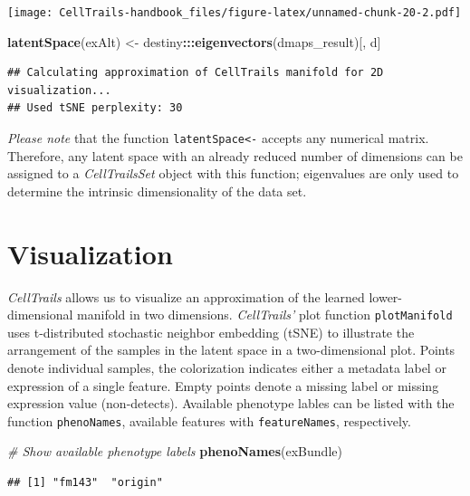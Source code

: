 \documentclass[]{book}
\newenvironment{Shaded}{\begin{snugshade}}{\end{snugshade}}
\newcommand{\KeywordTok}[1]{\textcolor[rgb]{0.13,0.29,0.53}{\textbf{#1}}}
\newcommand{\StringTok}[1]{\textcolor[rgb]{0.31,0.60,0.02}{#1}}
\newcommand{\CommentTok}[1]{\textcolor[rgb]{0.56,0.35,0.01}{\textit{#1}}}
\newcommand{\OperatorTok}[1]{\textcolor[rgb]{0.81,0.36,0.00}{\textbf{#1}}}
\newcommand{\NormalTok}[1]{#1}
\theoremstyle{definition}
\theoremstyle{definition}
\theoremstyle{definition}
\theoremstyle{remark}
\begin{document}
\texttt{[image: CellTrails-handbook\_files/figure-latex/unnamed-chunk-20-2.pdf]}

\begin{Shaded}
\begin{Highlighting}[]
\KeywordTok{latentSpace}\NormalTok{(exAlt) <-}\StringTok{ }\NormalTok{destiny}\OperatorTok{:::}\KeywordTok{eigenvectors}\NormalTok{(dmaps_result)[, d]}
\end{Highlighting}
\end{Shaded}

\begin{verbatim}
## Calculating approximation of CellTrails manifold for 2D visualization...
## Used tSNE perplexity: 30
\end{verbatim}

\emph{Please note} that the function \texttt{latentSpace\textless{}-}
accepts any numerical matrix. Therefore, any latent space with an
already reduced number of dimensions can be assigned to a
\emph{CellTrailsSet} object with this function; eigenvalues are only
used to determine the intrinsic dimensionality of the data set.

\section{Visualization}\label{visualization}

\emph{CellTrails} allows us to visualize an approximation of the learned
lower-dimensional manifold in two dimensions. \emph{CellTrails'} plot
function \texttt{plotManifold} uses t-distributed stochastic neighbor
embedding (tSNE) \citep{vdmaaten2008} to illustrate the arrangement of
the samples in the latent space in a two-dimensional plot. Points denote
individual samples, the colorization indicates either a metadata label
or expression of a single feature. Empty points denote a missing label
or missing expression value (non-detects). Available phenotype lables
can be listed with the function \texttt{phenoNames}, available features
with \texttt{featureNames}, respectively.

\begin{Shaded}
\begin{Highlighting}[]
\CommentTok{# Show available phenotype labels}
\KeywordTok{phenoNames}\NormalTok{(exBundle)}
\end{Highlighting}
\end{Shaded}

\begin{verbatim}
## [1] "fm143"  "origin"
\end{verbatim}
\end{document}
